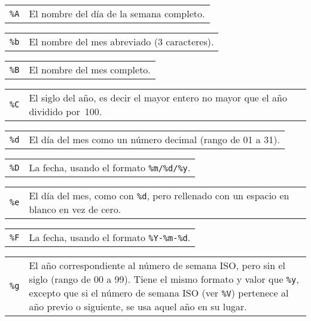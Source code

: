 \documentclass[11pt,spanish]{report}
\begin{document}
\begin{tabular}{@{}p{20pt}p{421.5pt}@{}}
{\tt\%A}&El nombre del día de la semana completo.\\
\end{tabular}

\begin{tabular}{@{}p{20pt}p{421.5pt}@{}}
{\tt\%b}&El nombre del mes abreviado (3 caracteres).\\
\end{tabular}

\begin{tabular}{@{}p{20pt}p{421.5pt}@{}}
{\tt\%B}&El nombre del mes completo.\\
\end{tabular}

\begin{tabular}{@{}p{20pt}p{421.5pt}@{}}
{\tt\%C}&El siglo del año, es decir el mayor entero no mayor que el año dividido por~100.\\
\end{tabular}

\begin{tabular}{@{}p{20pt}p{421.5pt}@{}}
{\tt\%d}&El día del mes como un número decimal (rango de 01 a 31).\\
\end{tabular}

\begin{tabular}{@{}p{20pt}p{421.5pt}@{}}
{\tt\%D}&La fecha, usando el formato \verb|%m/%d/%y|.\\
\end{tabular}

\begin{tabular}{@{}p{20pt}p{421.5pt}@{}}
{\tt\%e}&El día del mes, como con \verb|%d|, pero rellenado con un espacio en blanco en vez de cero.\\
\end{tabular}

\begin{tabular}{@{}p{20pt}p{421.5pt}@{}}
{\tt\%F}&La fecha, usando el formato \verb|%Y-%m-%d|.\\
\end{tabular}

\begin{tabular}{@{}p{20pt}p{421.5pt}@{}}
{\tt\%g}&El año correspondiente al número de semana ISO, pero sin el siglo (rango de 00 a 99). Tiene el mismo formato y valor que \verb|%y|, excepto que si el número de semana ISO (ver \verb|%V|) pertenece al año previo o siguiente, se usa aquel año en su lugar.\\
\end{tabular}
\end{document}
